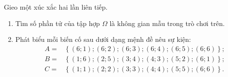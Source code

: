 \begin{bt}%
	Gieo một xúc xắc hai lần liên tiếp.
	\begin{enumerate}
		\item 	Tìm số phần tử của tập hợp $\Omega$ là không gian mẫu trong trò chơi trên.
		\item 	Phát biểu mỗi biến cố sau dưới dạng mệnh đề nêu sự kiện$\colon$
		\begin{eqnarray*}
			&A= & \left\{(6 ; 1) ;(6 ; 2) ;(6 ; 3) ;(6 ; 4) ;(6 ; 5) ;(6 ; 6)\right\} ; \\
			&B= &\left\{(1 ; 6) ;(2 ; 5) ;(3 ; 4) ;(4 ; 3) ;(5 ; 2) ;(6 ; 1)\right\} ; \\
			&C= & \left\{(1 ; 1) ;(2 ; 2) ;(3 ; 3) ;(4 ; 4) ;(5 ; 5) ;(6 ; 6)\right\} .
		\end{eqnarray*}
	\end{enumerate}
\end{bt}

